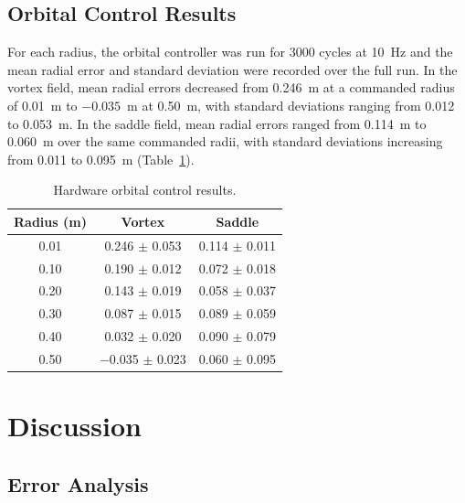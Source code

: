 \documentclass[12pt, letterpaper, oneside]{report}
\begin{document}
\subsection{Orbital Control Results}

For each radius, the orbital controller was run for 3000 cycles at 10~Hz
and the mean radial error and standard deviation were recorded over the
full run.
In the vortex field, mean radial errors decreased from 0.246~m at a
commanded radius of 0.01~m to $-0.035$~m at 0.50~m, with standard
deviations ranging from 0.012 to 0.053~m. In the saddle field, mean radial
errors ranged from 0.114~m to 0.060~m over the same commanded radii, with
standard deviations increasing from 0.011 to 0.095~m
(Table~\ref{tab:orbital_radius_comparison}).

\begin{table}[!t]
\centering
\caption{Hardware orbital control results.}
\label{tab:orbital_radius_comparison}
\begin{tabular}{ccc}
\toprule
\textbf{Radius (m)} & \textbf{Vortex} & \textbf{Saddle} \\
\midrule
0.01 & 0.246 $\pm$ 0.053 & 0.114 $\pm$ 0.011 \\
0.10 & 0.190 $\pm$ 0.012 & 0.072 $\pm$ 0.018 \\
0.20 & 0.143 $\pm$ 0.019 & 0.058 $\pm$ 0.037 \\
0.30 & 0.087 $\pm$ 0.015 & 0.089 $\pm$ 0.059 \\
0.40 & 0.032 $\pm$ 0.020 & 0.090 $\pm$ 0.079 \\
0.50 & $-$0.035 $\pm$ 0.023 & 0.060 $\pm$ 0.095 \\
\bottomrule
\end{tabular}
\end{table}

\section{Discussion}

\subsection{Error Analysis}
\label{sec:vf_error_analysis}
\end{document}
